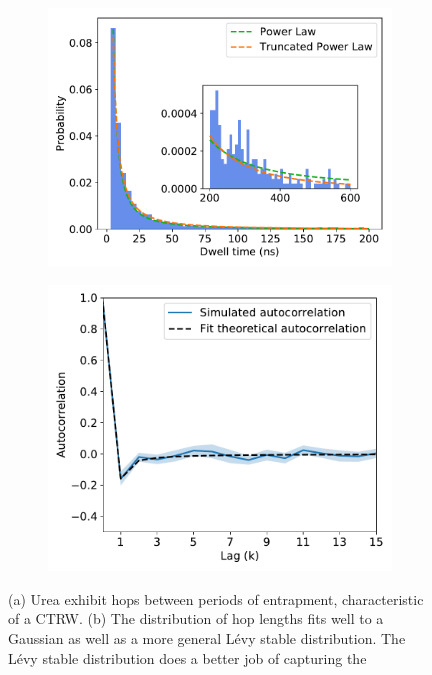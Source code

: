\documentclass{article}
\begin{document}
\begin{figure}
  \begin{subfigure}{0.45\textwidth}
  \includegraphics[width=\textwidth]{URE_powerlaw.pdf}
  \caption{}\label{fig:powerlaw}
  \end{subfigure}
  \begin{subfigure}{0.45\textwidth}
  \includegraphics[width=\textwidth]{URE_hop_acf.pdf}
  \caption{}\label{fig:hop_acf}
  \end{subfigure}
  \caption{(a) Urea exhibit hops between periods of entrapment, characteristic of a CTRW. 
  (b) The distribution of hop lengths fits well to a Gaussian as well as a more general L\'evy 
  stable distribution. The L\'evy stable distribution does a better job of capturing the 
}
\end{figure}
\end{document}
